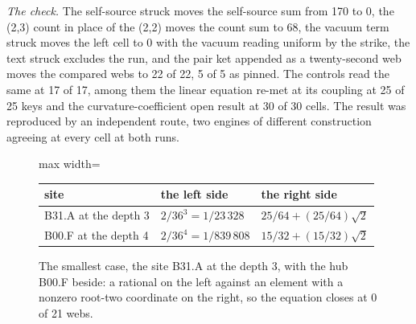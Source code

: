 \begin{chproof}
\textit{The check.} The self-source struck moves the self-source sum from 170 to 0, the (2,3) count in place of the (2,2) moves the count sum to 68, the vacuum term struck moves the left cell to 0 with the vacuum reading uniform by the strike, the text struck excludes the run, and the pair ket appended as a twenty-second web moves the compared webs to 22 of 22, 5 of 5 as pinned. The controls read the same at 17 of 17, among them the linear equation re-met at its coupling at 25 of 25 keys and the curvature-coefficient open result at 30 of 30 cells. The result was reproduced by an independent route, two engines of different construction agreeing at every cell at both runs.
\end{chproof}
\begin{figure}[h]
\centering
\begin{adjustbox}{max width=\linewidth}\begin{tabular}{lll}
\hline
site & the left side & the right side \\
\hline
B31.A at the depth 3 & $2/36^{3} = 1/23\,328$ & $25/64 + (25/64)\sqrt{2}$ \\
B00.F at the depth 4 & $2/36^{4} = 1/839\,808$ & $15/32 + (15/32)\sqrt{2}$ \\
\hline
\end{tabular}\end{adjustbox}
\caption{The smallest case, the site B31.A at the depth 3, with the hub B00.F beside: a rational on the left against an element with a nonzero root-two coordinate on the right, so the equation closes at 0 of 21 webs.}
\end{figure}
